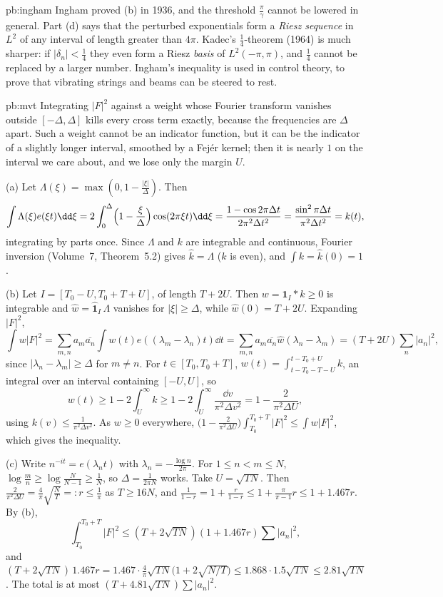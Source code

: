\begin{solution}{pb:ingham}
\leads Ingham proved (b) in 1936, and the threshold $\frac\pi\gamma$ cannot be lowered in general. Part (d) says that the perturbed exponentials
form a \emph{Riesz sequence} in $L^2$ of any interval of length greater than $4\pi$. Kadec's $\frac14$-theorem (1964) is much sharper: if $|\delta_n|<\frac14$ they even form a Riesz \emph{basis} of
$L^2(-\pi,\pi)$, and $\frac14$ cannot be replaced by a larger number. Ingham's inequality is used in control theory, to prove that vibrating strings and beams can be steered to rest.
\end{solution}

\begin{solution}{pb:mvt}
\idea Integrating $|F|^2$ against a weight whose Fourier transform vanishes outside $[-\Delta,\Delta]$ kills every cross term exactly, because the frequencies are $\Delta$ apart. Such a weight cannot
be an indicator function, but it can be the indicator of a slightly longer interval, smoothed by a Fejér kernel; then it is nearly $1$ on the interval we care about, and we lose only the
margin $U$.

\writeup (a) Let $\Lambda(\xi)=\max(0,1-\frac{|\xi|}\Delta)$. Then
\[
\int\Lambda(\xi)e(\xi t)\dd\xi=2\int_0^\Delta\Bigl(1-\frac\xi\Delta\Bigr)\cos(2\pi\xi t)\dd\xi=\frac{1-\cos2\pi\Delta t}{2\pi^2\Delta t^2}=\frac{\sin^2\pi\Delta t}{\pi^2\Delta t^2}=k(t),
\]
integrating by parts once. Since $\Lambda$ and $k$ are integrable and continuous, Fourier inversion (Volume~7, Theorem~5.2) gives $\hat k=\Lambda$ ($k$ is even), and $\int k=\hat k(0)=1$.

(b) Let $I=[T_0-U,T_0+T+U]$, of length $T+2U$. Then $w=\mathbf 1_I*k\ge0$ is integrable and $\hat w=\hat{\mathbf 1}_I\,\Lambda$ vanishes for $|\xi|\ge\Delta$, while $\hat w(0)=T+2U$. Expanding
$|F|^2$,
\[
\int w|F|^2=\sum_{m,n}a_m\overline{a_n}\int w(t)e((\lambda_m-\lambda_n)t)\dd t=\sum_{m,n}a_m\overline{a_n}\hat w(\lambda_n-\lambda_m)=(T+2U)\sum_n|a_n|^2,
\]
since $|\lambda_n-\lambda_m|\ge\Delta$ for $m\ne n$. For $t\in[T_0,T_0+T]$, $w(t)=\int_{t-T_0-T-U}^{t-T_0+U}k$, an integral over an interval containing $[-U,U]$, so
\[
w(t)\ge1-2\int_U^\infty k\ge1-2\int_U^\infty\frac{\dd v}{\pi^2\Delta v^2}=1-\frac2{\pi^2\Delta U},
\]
using $k(v)\le\frac1{\pi^2\Delta v^2}$. As $w\ge0$ everywhere, $\bigl(1-\frac2{\pi^2\Delta U}\bigr)\int_{T_0}^{T_0+T}|F|^2\le\int w|F|^2$, which gives the inequality.

(c) Write $n^{-it}=e(\lambda_nt)$ with $\lambda_n=-\frac{\log n}{2\pi}$. For $1\le n<m\le N$, $\log\frac mn\ge\log\frac N{N-1}\ge\frac1N$, so $\Delta=\frac1{2\pi N}$ works. Take $U=\sqrt{TN}$. Then
$\frac2{\pi^2\Delta U}=\frac4\pi\sqrt{\frac NT}=:r\le\frac1\pi$ as $T\ge16N$, and $\frac1{1-r}=1+\frac r{1-r}\le1+\frac\pi{\pi-1}r\le1+1.467r$. By (b),
\[
\int_{T_0}^{T_0+T}|F|^2\le(T+2\sqrt{TN})(1+1.467r)\sum|a_n|^2,
\]
and $(T+2\sqrt{TN})\,1.467r=1.467\cdot\frac4\pi\sqrt{TN}\bigl(1+2\sqrt{N/T}\bigr)\le1.868\cdot1.5\sqrt{TN}\le2.81\sqrt{TN}$. The total is at most $(T+4.81\sqrt{TN})\sum|a_n|^2$.


\end{solution}
